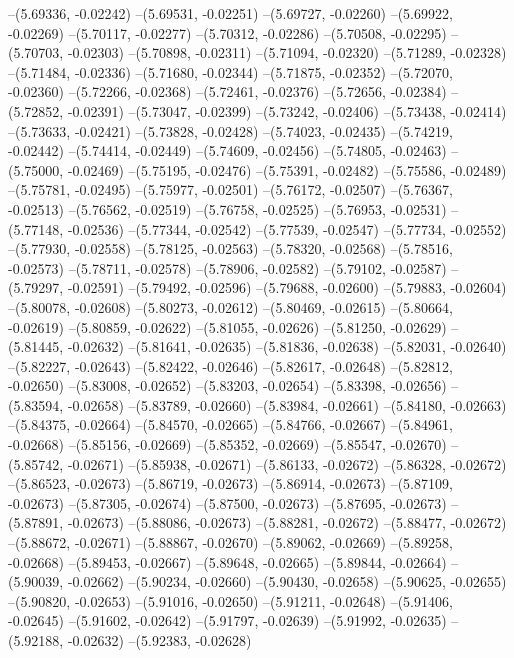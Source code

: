 --(5.69336, -0.02242)
--(5.69531, -0.02251)
--(5.69727, -0.02260)
--(5.69922, -0.02269)
--(5.70117, -0.02277)
--(5.70312, -0.02286)
--(5.70508, -0.02295)
--(5.70703, -0.02303)
--(5.70898, -0.02311)
--(5.71094, -0.02320)
--(5.71289, -0.02328)
--(5.71484, -0.02336)
--(5.71680, -0.02344)
--(5.71875, -0.02352)
--(5.72070, -0.02360)
--(5.72266, -0.02368)
--(5.72461, -0.02376)
--(5.72656, -0.02384)
--(5.72852, -0.02391)
--(5.73047, -0.02399)
--(5.73242, -0.02406)
--(5.73438, -0.02414)
--(5.73633, -0.02421)
--(5.73828, -0.02428)
--(5.74023, -0.02435)
--(5.74219, -0.02442)
--(5.74414, -0.02449)
--(5.74609, -0.02456)
--(5.74805, -0.02463)
--(5.75000, -0.02469)
--(5.75195, -0.02476)
--(5.75391, -0.02482)
--(5.75586, -0.02489)
--(5.75781, -0.02495)
--(5.75977, -0.02501)
--(5.76172, -0.02507)
--(5.76367, -0.02513)
--(5.76562, -0.02519)
--(5.76758, -0.02525)
--(5.76953, -0.02531)
--(5.77148, -0.02536)
--(5.77344, -0.02542)
--(5.77539, -0.02547)
--(5.77734, -0.02552)
--(5.77930, -0.02558)
--(5.78125, -0.02563)
--(5.78320, -0.02568)
--(5.78516, -0.02573)
--(5.78711, -0.02578)
--(5.78906, -0.02582)
--(5.79102, -0.02587)
--(5.79297, -0.02591)
--(5.79492, -0.02596)
--(5.79688, -0.02600)
--(5.79883, -0.02604)
--(5.80078, -0.02608)
--(5.80273, -0.02612)
--(5.80469, -0.02615)
--(5.80664, -0.02619)
--(5.80859, -0.02622)
--(5.81055, -0.02626)
--(5.81250, -0.02629)
--(5.81445, -0.02632)
--(5.81641, -0.02635)
--(5.81836, -0.02638)
--(5.82031, -0.02640)
--(5.82227, -0.02643)
--(5.82422, -0.02646)
--(5.82617, -0.02648)
--(5.82812, -0.02650)
--(5.83008, -0.02652)
--(5.83203, -0.02654)
--(5.83398, -0.02656)
--(5.83594, -0.02658)
--(5.83789, -0.02660)
--(5.83984, -0.02661)
--(5.84180, -0.02663)
--(5.84375, -0.02664)
--(5.84570, -0.02665)
--(5.84766, -0.02667)
--(5.84961, -0.02668)
--(5.85156, -0.02669)
--(5.85352, -0.02669)
--(5.85547, -0.02670)
--(5.85742, -0.02671)
--(5.85938, -0.02671)
--(5.86133, -0.02672)
--(5.86328, -0.02672)
--(5.86523, -0.02673)
--(5.86719, -0.02673)
--(5.86914, -0.02673)
--(5.87109, -0.02673)
--(5.87305, -0.02674)
--(5.87500, -0.02673)
--(5.87695, -0.02673)
--(5.87891, -0.02673)
--(5.88086, -0.02673)
--(5.88281, -0.02672)
--(5.88477, -0.02672)
--(5.88672, -0.02671)
--(5.88867, -0.02670)
--(5.89062, -0.02669)
--(5.89258, -0.02668)
--(5.89453, -0.02667)
--(5.89648, -0.02665)
--(5.89844, -0.02664)
--(5.90039, -0.02662)
--(5.90234, -0.02660)
--(5.90430, -0.02658)
--(5.90625, -0.02655)
--(5.90820, -0.02653)
--(5.91016, -0.02650)
--(5.91211, -0.02648)
--(5.91406, -0.02645)
--(5.91602, -0.02642)
--(5.91797, -0.02639)
--(5.91992, -0.02635)
--(5.92188, -0.02632)
--(5.92383, -0.02628)
